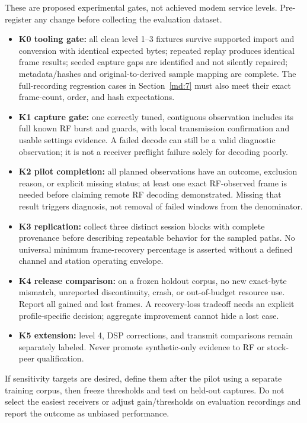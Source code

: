 \documentclass[11pt,a4paper]{article}
\begin{document}
These are proposed experimental gates, not achieved modem service levels. Pre-register any change before collecting the evaluation dataset.

\begin{itemize}
\item \textbf{K0 tooling gate:} all clean level 1--3 fixtures survive supported import and conversion with identical expected bytes; repeated replay produces identical frame results; seeded capture gaps are identified and not silently repaired; metadata/hashes and original-to-derived sample mapping are complete. The full-recording regression cases in Section~\ref{md:7} must also meet their exact frame-count, order, and hash expectations.
\item \textbf{K1 capture gate:} one correctly tuned, contiguous observation includes its full known RF burst and guards, with local transmission confirmation and usable settings evidence. A failed decode can still be a valid diagnostic observation; it is not a receiver preflight failure solely for decoding poorly.
\item \textbf{K2 pilot completion:} all planned observations have an outcome, exclusion reason, or explicit missing status; at least one exact RF-observed frame is needed before claiming remote RF decoding demonstrated. Missing that result triggers diagnosis, not removal of failed windows from the denominator.
\item \textbf{K3 replication:} collect three distinct session blocks with complete provenance before describing repeatable behavior for the sampled paths. No universal minimum frame-recovery percentage is asserted without a defined channel and station operating envelope.
\item \textbf{K4 release comparison:} on a frozen holdout corpus, no new exact-byte mismatch, unreported discontinuity, crash, or out-of-budget resource use. Report all gained and lost frames. A recovery-loss tradeoff needs an explicit profile-specific decision; aggregate improvement cannot hide a lost case.
\item \textbf{K5 extension:} level 4, DSP corrections, and transmit comparisons remain separately labeled. Never promote synthetic-only evidence to RF or stock-peer qualification.
\end{itemize}
If sensitivity targets are desired, define them after the pilot using a separate training corpus, then freeze thresholds and test on held-out captures. Do not select the easiest receivers or adjust gain/thresholds on evaluation recordings and report the outcome as unbiased performance.
\end{document}
